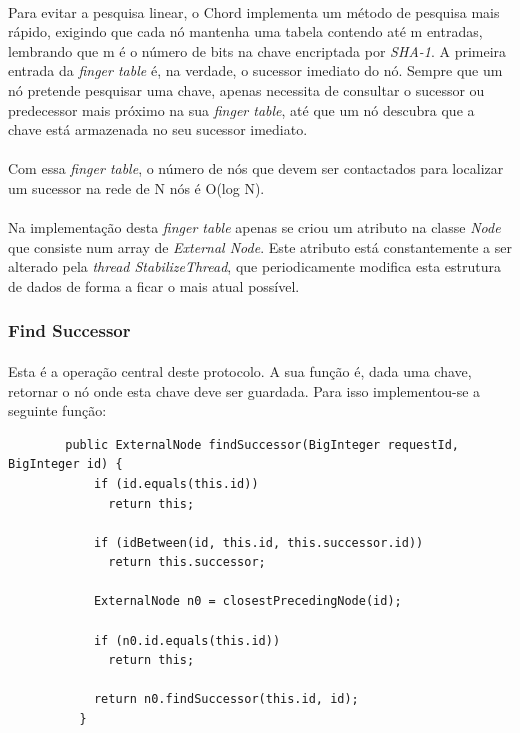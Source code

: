 \documentclass[11pt,oneside]{book}
\begin{document}
    \paragraph{}
    Para evitar a pesquisa linear, o Chord implementa um método de pesquisa mais rápido, exigindo
    que cada nó mantenha uma tabela contendo até m entradas, lembrando que m é o número de bits na 
    chave encriptada por \textit{SHA-1}. A primeira entrada da \textit{finger table} é, na verdade,
    o sucessor imediato do nó. Sempre que um nó pretende pesquisar uma chave, apenas necessita de
    consultar o sucessor ou predecessor mais próximo na sua \textit{finger table}, até que um nó 
    descubra que a chave está armazenada no seu sucessor imediato.

    \paragraph{}
    Com essa \textit{finger table}, o número de nós que devem ser contactados para localizar 
    um sucessor na rede de N nós é O(log N).

    \paragraph{}
    Na implementação desta \textit{finger table} apenas se criou um atributo na classe \textit{Node}
    que consiste num array de \textit{External Node}. Este atributo está constantemente a ser
    alterado pela \textit{thread StabilizeThread}, que periodicamente modifica esta estrutura de dados
    de forma a ficar o mais atual possível.

    \subsubsection{Find Successor}
    \paragraph{}
    Esta é a operação central deste protocolo. A sua função é, dada uma chave, retornar o nó onde
    esta chave deve ser guardada. Para isso implementou-se a seguinte função:
    \begin{lstlisting}
        public ExternalNode findSuccessor(BigInteger requestId, BigInteger id) {
            if (id.equals(this.id))
              return this;
        
            if (idBetween(id, this.id, this.successor.id))
              return this.successor;
        
            ExternalNode n0 = closestPrecedingNode(id);
        
            if (n0.id.equals(this.id))
              return this;
        
            return n0.findSuccessor(this.id, id);
          }
        
    \end{lstlisting}
\end{document}
